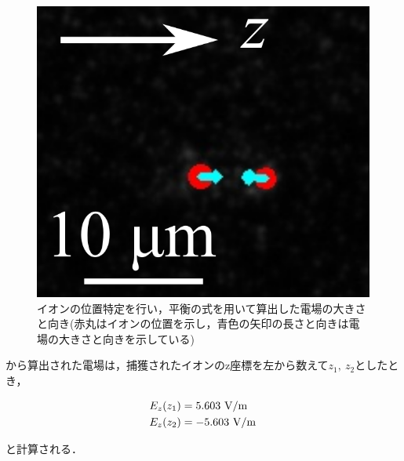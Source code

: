 \begin{figure}[h]
	\begin{center}
		\includegraphics[scale=0.8]{./methods/figure/out_image.png}
		\caption{イオンの位置特定を行い，平衡の式を用いて算出した電場の大きさと向き(赤丸はイオンの位置を示し，青色の矢印の長さと向きは電場の大きさと向きを示している)}
		\label{fig:out_image}
	\end{center}
\end{figure}

から算出された電場は，捕獲されたイオンのz座標を左から数えて$z_{1}, \ z_{2}$としたとき，

\begin{align*}
	E_{z}(z_1) &= 5.603 \ {\rm V/m} \\
	E_{z}(z_2) &= -5.603 \ {\rm V/m} 
\end{align*}

と計算される．
